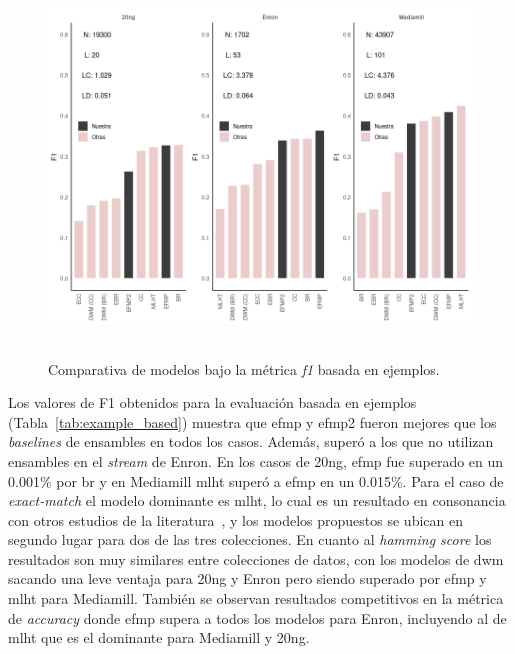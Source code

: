 \begin{figure}
	\includegraphics[width=\linewidth,height=10cm]{figures/experiments/classification/f1_ex.png}
	\caption{Comparativa de modelos bajo la métrica \textit{f1} basada en
		ejemplos.}
	\label{fig:comparativa_f1_ex}
\end{figure}

Los valores de F1 obtenidos para la evaluación basada en ejemplos
(Tabla~\ref{tab:example_based}) muestra que \acrshort{efmp} y \acrshort{efmp2}
fueron mejores que los \textit{baselines} de ensambles en todos los casos.
Además, superó a los que no utilizan ensambles en el \textit{stream} de Enron.
En los casos de 20ng, \acrshort{efmp} fue superado en un 0.001\% por
\acrshort{br} y en Mediamill \acrshort{mlht} superó a \acrshort{efmp} en un
0.015\%. Para el caso de \textit{exact-match} el modelo dominante es
\acrshort{mlht}, lo cual es un resultado en consonancia con otros estudios de la
literatura~\cite{read_scalable_2012,osojnik_multi-label_2017,zheng_survey_2020},
y los modelos propuestos se ubican en segundo lugar para dos de las tres
colecciones. En cuanto al \textit{hamming score} los resultados son muy
similares entre colecciones de datos, con los modelos de \acrshort{dwm} sacando
una leve ventaja para 20ng y Enron pero siendo superado por \acrshort{efmp} y
\acrshort{mlht} para Mediamill. También se observan resultados competitivos en
la métrica de \textit{accuracy} donde \acrshort{efmp} supera a todos los modelos
para Enron, incluyendo al de \acrshort{mlht} que es el dominante para Mediamill
y 20ng.

